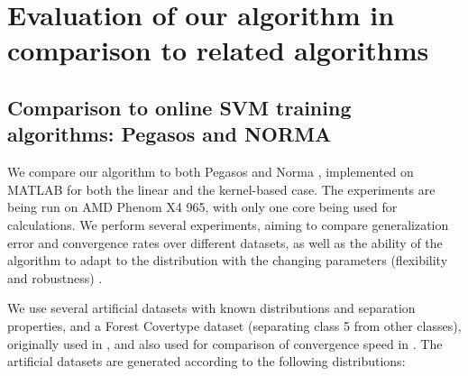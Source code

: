 

\ifpdf
    \graphicspath{{5/figures/PNG/}{5/figures/PDF/}{5/figures/}}
\else
    \graphicspath{{5/figures/EPS/}{5/figures/}}
\fi


\captionsetup[subfigure]{labelfont=bf,textfont=normalfont,singlelinecheck=off,justification=centering}

\chapter{Evaluation of our algorithm in comparison to related algorithms} %
\section{Comparison to online SVM training algorithms: Pegasos and NORMA}
\label{ExperimentsNorma}
We compare our algorithm to both Pegasos \cite{Pegasos} and Norma \cite{Norma}, implemented on MATLAB for both the linear and the kernel-based case. The experiments are being run on AMD Phenom X4 965, with only one core being used for calculations. We perform several experiments, aiming to compare generalization error and convergence rates over different datasets, as well as the ability of the algorithm to adapt to the distribution with the changing parameters (flexibility and robustness) . 

We use several artificial datasets with known distributions and separation properties, and a Forest Covertype dataset (separating class 5 from other classes), originally used in \cite{Forest}, and also used for comparison of convergence speed in \cite{Pegasos}. The artificial datasets are generated  according to the following distributions:

